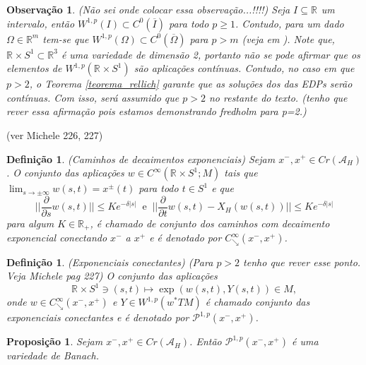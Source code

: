 \documentclass[12pt]{book}
\newtheorem{definicao}[teorema]{Definição}
\newtheorem{observacao}[teorema]{Observação}
\newtheorem{proposicao}[teorema]{Proposição}
\newcommand{\aplicaoessuavesreatacirculo}{C^{\infty}(\retacartesianocirculo; M)}
\newcommand{\caminhosdecaimentoexponencial}[2]{C^{\infty}_{\searrow}(#1, #2)}
\newcommand{\caminhosdecaimentoexponencialpadrao}{\caminhosdecaimentoexponencial{x^{-}}{x^{+}}}
\newcommand{\caminhosexponenciaisconectantes}[2]{\mathcal{P}^{1,p}(#1, #2)}
\newcommand{\caminhosexponenciaisconectantespadrao}{\caminhosexponenciaisconectantes{x^{-}}{x^{+}}}
\newcommand{\circulo}{S^{1}}
\newcommand{\derivadaparcial}[2]{\frac{\partial #1}{\partial #2}}
\newcommand{\espacosobolev}[1]{W^{1,p}(#1)}
\newcommand{\funcionalH}{\mathcal{A}_{H}}
\newcommand{\normagrande}[1]{\Big|\Big|#1\Big|\Big|}
\newcommand{\pontoscriticos}[1]{\textit{Cr}(#1)}
\newcommand{\pullbackfibradotangente}[2]{#1^{*}T#2}
\newcommand{\pullbackfibradotangenteM}[1]{\pullbackfibradotangente{#1}{M}}
\newcommand{\retacartesianocirculo}{\real{} \times \circulo}
\newcommand{\real}[1]{\mathbb{R}^{#1}}
\newcommand{\reta}{\real{}}
\newcommand{\aviso}[1]{{\color{violet}(#1)}}
\newcommand{\alerta}[1]{{\color{red}#1}}
\begin{document}
\alerta{	\begin{observacao} (Não sei onde colocar essa observação...!!!!)
		Seja $I\subseteq \reta$ um intervalo, então $\espacosobolev{I} \subset C^{0}(\overline{I})$ para todo $p\geq 1$. Contudo, para um dado $\Omega \in \real{m}$ tem-se que $\espacosobolev{\Omega} \subset C^{0}(\overline{\Omega})$ para $p>m$ (veja em \cite{audi_floer_homology}). Note que, $\retacartesianocirculo \subset \real{3}$ é uma variedade de dimensão 2, portanto não se pode afirmar que os elementos de $\espacosobolev{\retacartesianocirculo}$ são aplicações contínuas. Contudo, no caso em que $p>2$, o Teorema \ref{teorema_rellich} garante que as soluções dos das EDPs serão contínuas. Com isso, será assumido que $p>2$ no restante do texto. (tenho que rever essa afirmação pois estamos demonstrando fredholm para p=2.)
	\end{observacao}
}
	\aviso{ver Michele 226, 227}
	\begin{definicao}\label{definicao_caminhos_decaimentos_exponenciais}
		(Caminhos de decaimentos exponenciais) Sejam $x^{-}, x^{+} \in \pontoscriticos{\funcionalH}$. O conjunto das aplicações $w \in \aplicaoessuavesreatacirculo$ tais que $\lim_{s \to \pm \infty} w(s,t) = x^{\pm}(t)$ para todo  $t\in \circulo $ e que 
		$$
		\normagrande{\derivadaparcial{}{s}w(s,t)} \leq Ke^{-\delta|s|} \;\; \text{e} \;\; \normagrande{\derivadaparcial{}{t}w(s,t) -X_{H}(w(s,t))} \leq Ke^{-\delta|s|}
		$$
		para algum $K\in \reta_{+}$, é chamado de conjunto dos caminhos com decaimento exponencial conectando $x^{-}$ a $x^{+}$ e é denotado por $\caminhosdecaimentoexponencialpadrao$.
	\end{definicao}
	
	\begin{definicao}
		(Exponenciais conectantes) \alerta{(Para $p>2$ tenho que rever esse ponto. Veja Michele pag 227)} O conjunto das aplicações 
		$$
		\retacartesianocirculo \ni (s,t) \mapsto \exp(w(s,t), Y(s,t)) \in M,
		$$
		onde $w \in \caminhosdecaimentoexponencialpadrao$ e $Y\in \espacosobolev{\pullbackfibradotangenteM{w}}$ é chamado conjunto das exponenciais conectantes e é denotado por $\caminhosexponenciaisconectantespadrao$.
	\end{definicao}
	
	\begin{proposicao}\label{proposicao_variedade_banach}
		Sejam $x^{-}, x^{+} \in \pontoscriticos{\funcionalH}$. Então $\caminhosexponenciaisconectantespadrao$ é uma variedade de Banach.
	\end{proposicao}
	
\end{document}
